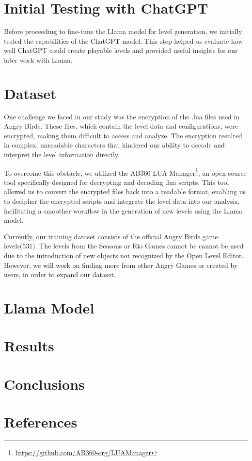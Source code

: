 \documentclass[twocolumn]{article}
\begin{document}
\section*{Initial Testing with ChatGPT}

Before proceeding to fine-tune the Llama model for level generation, we initially tested the capabilities of the ChatGPT model. This step helped us evaluate how well ChatGPT could create playable levels and provided useful insights for our later work with Llama.


\section*{Dataset}


One challenge we faced in our study was the encryption of the .lua files used in Angry Birds. These files, which contain the level data and configurations, were encrypted, making them difficult to access and analyze. The encryption resulted in complex, unreadable characters that hindered our ability to decode and interpret the level information directly.

To overcome this obstacle, we utilized the AB360 LUA Manager\footnote{\url{https://github.com/AB360-org/LUAManager}}, an open-source tool specifically designed for decrypting and decoding .lua scripts. This tool allowed us to convert the encrypted files back into a readable format, enabling us to decipher the encrypted scripts and integrate the level data into our analysis, facilitating a smoother workflow in the generation of new levels using the Llama model.




Currently, our training dataset consists of the official Angry Birds game levels(531). The levels from the Seasons or Rio Games cannot be cannot be used due to the introduction of new objects not recognized by the Open Level Editor. However, we will work on finding more from other Angry Games or created by users, in order to expand our dataset.
\section*{Llama Model}
\section*{Results}
\section*{Conclusions}

\section*{References}
\end{document}
